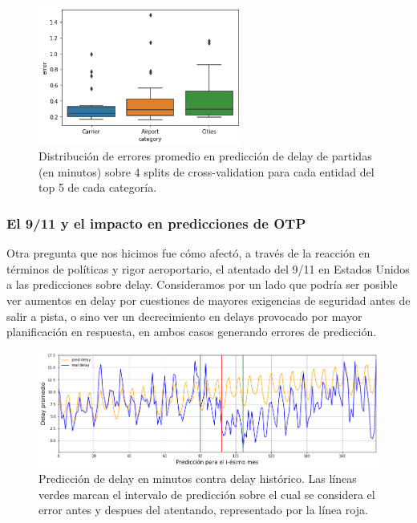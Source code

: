 \begin{figure}[h]
  \includegraphics[width=0.6\textwidth, height=0.24\textheight]{./img/cats_depdelay.png}
  \centering
  \caption{
  Distribución de errores promedio en predicción de delay de partidas (en minutos) sobre 4 splits de cross-validation para cada entidad del top 5 de cada categoría.
}
  \label{fig:cats-depdelay}
\end{figure}
\subsubsection{El 9/11 y el impacto en predicciones de OTP}
Otra pregunta que nos hicimos fue cómo afectó, a través de la reacción en términos de políticas y rigor aeroportario, el atentado del 9/11 en Estados Unidos a las predicciones sobre delay. Consideramos por un lado que podría ser posible ver aumentos en delay por cuestiones de mayores exigencias de seguridad antes de salir a pista, o sino ver un decrecimiento en delays provocado por mayor planificación en respuesta, en ambos casos generando errores de predicción.

\begin{figure}[h]
  \includegraphics[width=1.0\textwidth, height=0.24\textheight]{./img/nine_eleven.png}
  \centering
  \caption{
  Predicción de delay en minutos contra delay histórico. Las líneas verdes marcan el intervalo de predicción sobre el cual se considera el error antes y despues del atentando, representado por la línea roja.
}
  \label{fig:nine_eleven}
\end{figure}

